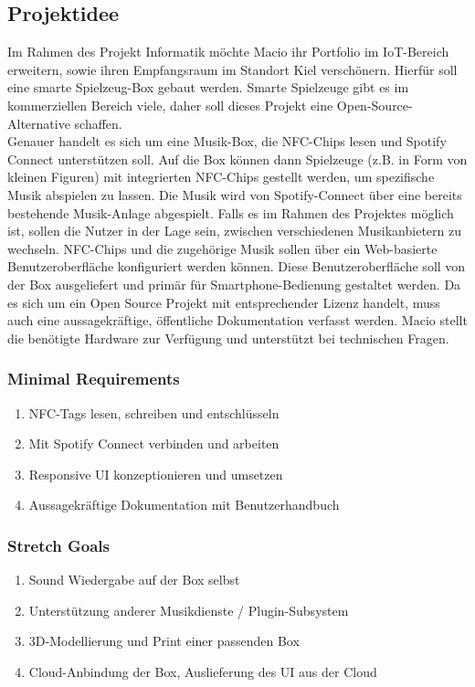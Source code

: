 \documentclass[10pt, a4paper]{article}
\begin{document}
\subsection{Projektidee}
Im Rahmen des Projekt Informatik möchte Macio ihr Portfolio im IoT-Bereich erweitern, sowie ihren Empfangsraum im Standort Kiel verschönern.
Hierfür soll eine smarte Spielzeug-Box gebaut werden.
Smarte Spielzeuge gibt es im kommerziellen Bereich viele, daher soll dieses Projekt eine Open-Source-Alternative schaffen.\\
Genauer handelt es sich um eine Musik-Box, die NFC-Chips lesen und Spotify Connect unterstützen soll.
Auf die Box können dann Spielzeuge (z.B. in Form von kleinen Figuren) mit integrierten NFC-Chips gestellt werden, um spezifische Musik abspielen zu lassen.
Die Musik wird von Spotify-Connect über eine bereits bestehende Musik-Anlage abgespielt.
Falls es im Rahmen des Projektes möglich ist, sollen die Nutzer in der Lage sein, zwischen verschiedenen Musikanbietern zu wechseln.
NFC-Chips und die zugehörige Musik sollen über ein Web-basierte Benutzeroberfläche konfiguriert werden können.
Diese Benutzeroberfläche soll von der Box ausgeliefert und primär für Smartphone-Bedienung gestaltet werden.
Da es sich um ein Open Source Projekt mit entsprechender Lizenz handelt, muss auch eine aussagekräftige, öffentliche Dokumentation verfasst werden.
Macio stellt die benötigte Hardware zur Verfügung und unterstützt bei technischen Fragen.

\subsubsection{Minimal Requirements}
\begin{enumerate}
  \item NFC-Tags lesen, schreiben und entschlüsseln
  \item Mit Spotify Connect verbinden und arbeiten
  \item Responsive UI konzeptionieren und umsetzen
  \item Aussagekräftige Dokumentation mit Benutzerhandbuch
\end{enumerate}
\subsubsection{Stretch Goals}
\begin{enumerate}
  \item Sound Wiedergabe auf der Box selbst
  \item Unterstützung anderer Musikdienste / Plugin-Subsystem
  \item 3D-Modellierung und Print einer passenden Box
  \item Cloud-Anbindung der Box, Auslieferung des UI aus der Cloud
\end{enumerate}
\end{document}
